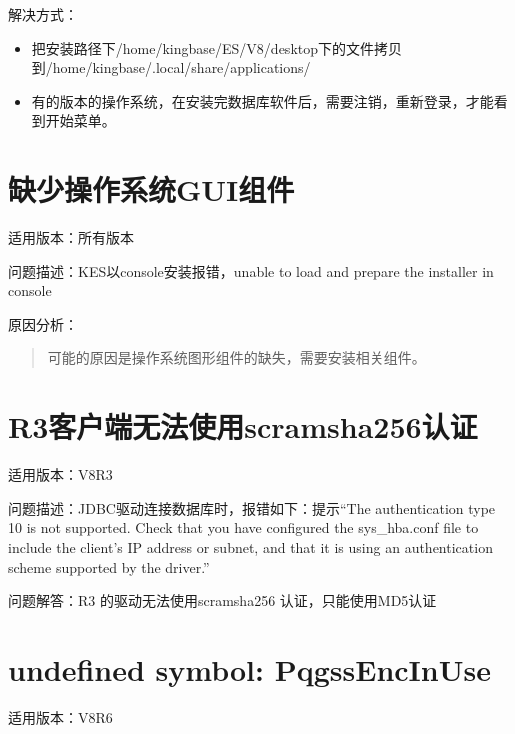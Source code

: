 \documentclass[letterpaper,10pt,english]{sphinxmanual}
\begin{document}
解决方式：
\begin{itemize}
\item {} 
把安装路径下/home/kingbase/ES/V8/desktop下的文件拷贝到/home/kingbase/.local/share/applications/

\item {} 
有的版本的操作系统，在安装完数据库软件后，需要注销，重新登录，才能看到开始菜单。

\end{itemize}


\section{缺少操作系统GUI组件}
\label{\detokenize{tools:gui}}
适用版本：所有版本

问题描述：KES以console安装报错，unable to load and prepare the installer in console

原因分析：
\begin{quote}

可能的原因是操作系统图形组件的缺失，需要安装相关组件。

\begin{sphinxVerbatim}[commandchars=\\\{\}]
  
  
  
\end{sphinxVerbatim}
\end{quote}


\section{R3客户端无法使用scram\sphinxhyphen{}sha\sphinxhyphen{}256认证}
\label{\detokenize{tools:r3scram-sha-256}}
适用版本：V8R3

问题描述：JDBC驱动连接数据库时，报错如下：提示“The authentication type 10 is not supported. Check that you have configured the sys\_hba.conf file to include the client's IP address or subnet, and that it is using an authentication scheme supported by the driver.”

问题解答：R3 的驱动无法使用scram\sphinxhyphen{}sha\sphinxhyphen{}256 认证，只能使用MD5认证


\section{undefined symbol: PqgssEncInUse}
\label{\detokenize{tools:undefined-symbol-pqgssencinuse}}
适用版本：V8R6
\end{document}
